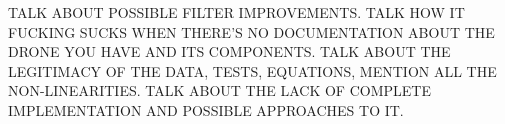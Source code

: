 TALK ABOUT POSSIBLE FILTER IMPROVEMENTS. TALK HOW IT FUCKING SUCKS WHEN THERE'S NO DOCUMENTATION ABOUT THE DRONE YOU HAVE AND ITS COMPONENTS. TALK ABOUT THE LEGITIMACY OF THE DATA, TESTS, EQUATIONS, MENTION ALL THE NON-LINEARITIES. TALK ABOUT THE LACK OF COMPLETE IMPLEMENTATION AND POSSIBLE APPROACHES TO IT.